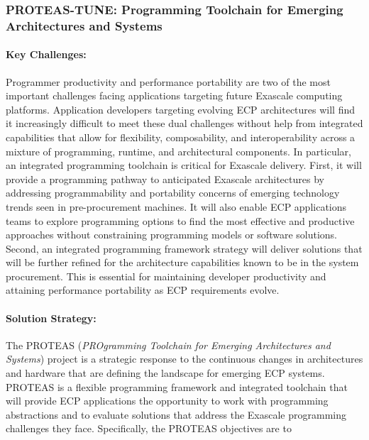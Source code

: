 \subsubsection{ PROTEAS-TUNE: Programming Toolchain for Emerging Architectures and Systems} 


\paragraph{Key  Challenges:}
Programmer productivity and performance portability are two of the most important challenges facing applications targeting future Exascale computing platforms. Application developers targeting evolving ECP architectures will find it increasingly difficult to meet these dual challenges without help from integrated capabilities that allow for flexibility, composability, and interoperability across a mixture of programming, runtime, and architectural components. In particular, an integrated programming toolchain is critical for Exascale delivery. First, it will provide a programming pathway to anticipated Exascale architectures by addressing programmability and portability concerns of emerging technology trends seen in pre-procurement machines. It will also enable ECP applications teams to explore programming options to find the most effective and productive approaches without constraining programming models or software solutions. Second, an integrated programming framework strategy will deliver solutions that will be further refined for the architecture capabilities known to be in the system procurement. This is essential for maintaining developer productivity and attaining performance portability as ECP requirements evolve.


\paragraph{Solution Strategy:}
The PROTEAS (\textit{PROgramming Toolchain for Emerging Architectures and Systems}) project is a strategic response to the continuous changes in architectures and hardware that are defining the landscape for emerging ECP systems. PROTEAS is a flexible programming framework and integrated toolchain that will provide ECP applications the opportunity to work with programming abstractions and to evaluate solutions that address the Exascale programming challenges they face. Specifically, the PROTEAS objectives are to

